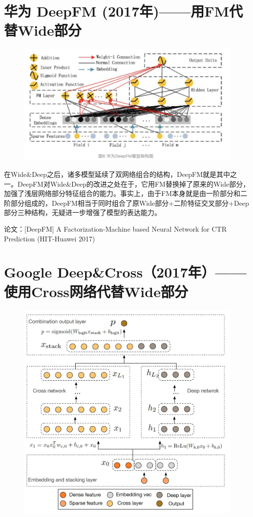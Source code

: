 \documentclass[12pt]{article}
\begin{document}
\section{华为 DeepFM (2017年)——用FM代替Wide部分}
\begin{figure}[H]
    \centering
    \includegraphics[width=.8\textwidth]{fig/Huawei_DeepFM_Structure.png}
\end{figure}

在Wide\&Deep之后，诸多模型延续了双网络组合的结构，DeepFM就是其中之一。DeepFM对Wide\&Deep的改进之处在于，它用FM替换掉了原来的Wide部分，加强了浅层网络部分特征组合的能力。事实上，由于FM本身就是由一阶部分和二阶部分组成的，DeepFM相当于同时组合了原Wide部分+二阶特征交叉部分+Deep部分三种结构，无疑进一步增强了模型的表达能力。

论文：[DeepFM] A Factorization-Machine based Neural Network for CTR Prediction (HIT-Huawei 2017)

\section{Google Deep\&Cross（2017年）——使用Cross网络代替Wide部分}
\begin{figure}[H]
    \centering
    \includegraphics[width=.8\textwidth]{fig/Google_Deep_Cross_Network_Structure.jpg}
\end{figure}
\end{document}
